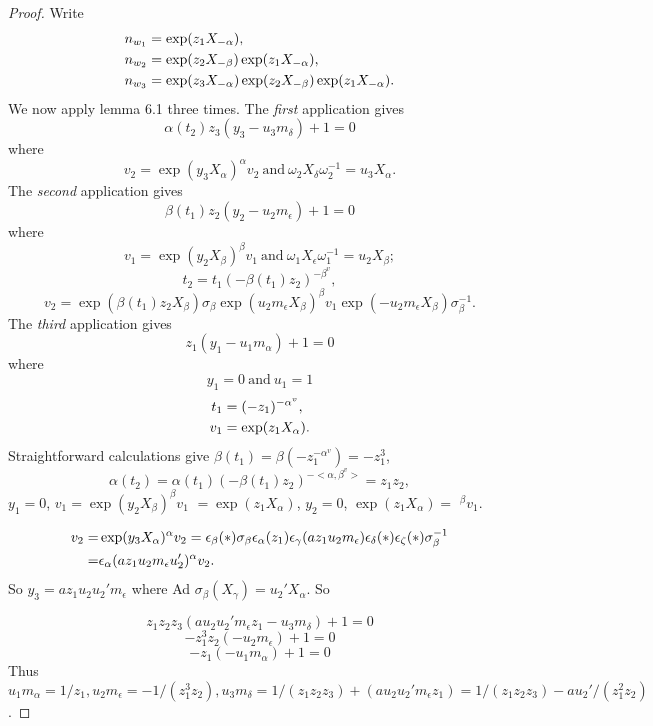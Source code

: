 \documentclass{memo-l}
\theoremstyle{definition}
\theoremstyle{remark}
\numberwithin{section}{chapter}
\numberwithin{equation}{chapter}
\begin{document}
\begin{proof}
\noindent
Write
$$
\aligned
n_{w_1} &= \exp(z_{1}X_{-{\alpha}}), \\
n_{w_2} &= \exp(z_{2}X_{-{\beta}})\exp(z_{1}X_{-{\alpha}}), \\
n_{w_3 }&= \exp(z_{3}X_{-{\alpha}})\exp(z_{2}X_{-{\beta}})\exp(z_{1}X_{-{\alpha}}) .
\endaligned
$$
We now apply lemma 6.1 three times.  The {\it  first}  application gives
$$
{\alpha}(t_{2})z_{3}(y_{3}-u_{3}m_{{\delta}})+1 = 0
$$
where
$$
v_{2} = \exp(y_{3}X_{{\alpha}})^{{\alpha}}v_{2}\ {\text{and}}\ {\omega}_{2}
X_{{\delta}}{\omega}_{2}^{-1}=u_{3}X_{{\alpha}}.
$$
The {\it second}  application gives
$$
{\beta}(t_{1})z_{2}(y_{2}-u_{2}m_{{\epsilon}})+1 = 0
$$
where
$$v_{1} = \exp(y_{2}X_{{\beta}})^{{\beta}}v_{1}\ {\text{and}}\
{\omega}_{1}X_{{\epsilon}}{\omega}_{1}^{-1}=u_{2}X_{{\beta}};
$$
$$
t_{2} = t_{1}(-{\beta}(t_{1})z_{2})^{-{\beta}^{v}} ,
$$
$$
v_{2} = \exp({\beta}(t_{1})z_{2}X_{{\beta}}){\sigma}_{{\beta}}\exp(u_{2}
m_{{\epsilon}}X_{{\beta}})^{{\beta}}v_{1}\exp(-u_{2}m_{{\epsilon}}
X_{{\beta}}){\sigma}_{{\beta}}^{-1}.
$$
The {\it third}  application gives
$$
z_{1}(y_{1}-u_{1}m_{{\alpha}}) + 1 = 0
$$
where
$$y_{1} = 0\ {\text{and}}\  u_{1} = 1
$$
$$
\aligned
t_{1} &= (-z_{1})^{-{\alpha}^{v}} , \\
v_{1} &= \exp(z_{1}X_{{\alpha}}).
\endaligned
$$
Straightforward calculations give ${\beta}(t_{1}) = {\beta}(-z_{1}^{-\alpha^v})
= -z_{1}^{3}$, $${\alpha}(t_{2}) =
{\alpha}(t_{1})(-{\beta}(t_{1})z_{2})^{-<\alpha,\beta^v>}
= z_{1}z_{2},$$
$y_{1}=0$, $v_{1} = \exp(y_{2}X_{{\beta}})^{{\beta}}v_{1}$
$= \exp(z_{1}X_{{\alpha}})$, $y_{2} = 0$, $\exp(z_{1}X_{{\alpha}}) =$
${}^\beta v_1$.

\noindent
$$
\aligned
v_{2} =& \exp(y_{3}X_{{\alpha}})^{{\alpha}}v_{2} = {\epsilon}_{{\beta}}(*)
{\sigma}_{{\beta}}{\epsilon}_{{\alpha}}(z_{1}){\epsilon}_{{\gamma}}
(az_{1}u_{2}m_{{\epsilon}}){\epsilon}_{{\delta}}(*){\epsilon}_{{\zeta}}(*)
{\sigma}_{{\beta}}^{-1}
\\ =& {\epsilon}_{{\alpha}}(az_{1}u_{2}m_{{\epsilon}}
u_{2}')^{{\alpha}}v_{2}
. \endaligned$$
So $y_{3} = az_{1}u_{2}u_{2}'m_{{\epsilon}}$ where Ad ${\sigma}_{{\beta}}
(X_{{\gamma}})=u_{2}'X_{{\alpha}}$.
 So

$$z_{1}z_{2}z_{3}(au_{2}u_{2}'m_{{\epsilon}}z_{1}-u_{3}m_{{\delta}})+1 = 0$$
$$
-z_{1}^{3}z_{2}(-u_{2}m_{{\epsilon}})+1 = 0
$$
$$
-z_{1}(-u_{1}m_{{\alpha}})+1 = 0
$$
Thus $u_{1}m_{{\alpha}}=1/z_{1}, u_{2}m_{{\epsilon}}=-1/(z_{1}^{3}z_{2}),
u_{3}m_{{\delta}}=1/(z_{1}z_{2}z_{3}) + (au_{2}u_{2}'m_{{\epsilon}}z_{1})
= 1/(z_{1}z_{2}z_{3}) - au_{2}'/(z_{1}^{2}z_{2})$.


\end{proof}
\end{document}
